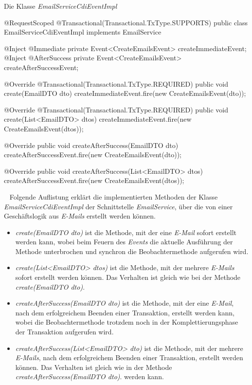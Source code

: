 \begin{program}[h]
\caption{Die Klasse \emph{EmailServiceCdiEventImpl}}
\label{prog:emailServiceCdiEventImpl}
\begin{JavaCode}
@RequestScoped
@Transactional(Transactional.TxType.SUPPORTS)
public class EmailServiceCdiEventImpl implements EmailService {
    @Inject
    @Immediate
    private Event<CreateEmailsEvent> createImmediateEvent;
    @Inject
    @AfterSuccess
    private Event<CreateEmailsEvent> createAfterSuccessEvent;

    @Override
    @Transactional(Transactional.TxType.REQUIRED)
    public void create(EmailDTO dto) {
        createImmediateEvent.fire(new CreateEmailsEvent(dto));
    }

    @Override
    @Transactional(Transactional.TxType.REQUIRED)
    public void create(List<EmailDTO> dtos) {
        createImmediateEvent.fire(new CreateEmailsEvent(dtos));
    }

    @Override
    public void createAfterSuccess(EmailDTO dto) {
        createAfterSuccessEvent.fire(new CreateEmailsEvent(dto));
    }

    @Override
    public void createAfterSuccess(List<EmailDTO> dtos) {
        createAfterSuccessEvent.fire(new CreateEmailsEvent(dtos));
    }
}
\end{JavaCode}
\end{program}
\ \newpage
Folgende Auflistung erklärt die implementierten Methoden der Klasse \emph{EmailServiceCdiEventImpl} der Schnittstelle \emph{EmailService}, über die von einer Geschäftslogik aus \emph{E-Mails} erstellt werden können.
\begin{itemize}
	\item\emph{create(EmailDTO dto)}
	\newline
	ist die Methode, mit der eine \emph{E-Mail} sofort erstellt werden kann, wobei beim Feuern des \emph{Events} die aktuelle Ausführung der Methode unterbrochen und synchron die Beobachtermethode aufgerufen wird.
	\item\emph{create(List<EmailDTO> dtos)}
	\newline
	ist die Methode, mit der mehrere \emph{E-Mails} sofort erstellt werden können. Das Verhalten ist gleich wie bei der Methode \emph{create(EmailDTO dto)}.
	\item\emph{createAfterSuccess(EmailDTO dto)}
	\newline
	ist die Methode, mit der eine \emph{E-Mail}, nach dem erfolgreichem Beenden einer Transaktion, erstellt werden kann, wobei die Beobachtermethode trotzdem noch in der Komplettierungsphase der Transaktion aufgerufen wird.
	\item\emph{createAfterSuccess(List<EmailDTO> dto)}
	\newline
	ist die Methode, mit der mehrere \emph{E-Mails}, nach dem erfolgreichem Beenden einer Transaktion, erstellt werden können. Das Verhalten ist gleich wie in der Methode \emph{createAfterSuccess(EmailDTO dto)}.
 werden kann.    
\end{itemize} 

